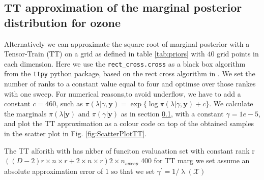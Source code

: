 \subsection{TT approximation of the marginal posterior distribution for ozone}
Alternatively we can approximate the square root of marginal posterior with a Tensor-Train (TT) on a grid as defined in table \ref{tab:priors} with $40$ grid points in each dimension.
Here we use the \texttt{rect\_cross.cross} as a black box algorithm from the \texttt{ttpy} python package, based on the rect cross algorithm in \cite{}.
We set the number of ranks to a constant value equal to four and optimse over those rankes with one sweep.
For numerical reasons,to avoid underflow, we have to add a constant $c = 460$, such as $\pi(\lambda | \gamma ,\bm{y}) = \exp\{ \log{\pi(\lambda | \gamma, \bm{y})} + c\}$.
We calculate the marginals $\pi(\lambda| \bm{y})$ and $\pi(\gamma| \bm{y})$ as in section \ref{}, with a constant $\gamma = 1e-5 $, and plot the TT approximation as a colour code on top of the obtained samples in the scatter plot in Fig. \ref{fig:ScatterPlotTT}.


The TT alforith with has nkber of funciton evaluaation set with constant rank r 
$( (D-2) r \times n\times r + 2  \times n \times r)2 \times n_{sweep}$
400 for TT marg
we set assume an absolute approximation error of $1$ so that we set $\gamma^{\prime} = 1 / \uplambda(\mathcal{X}) $

